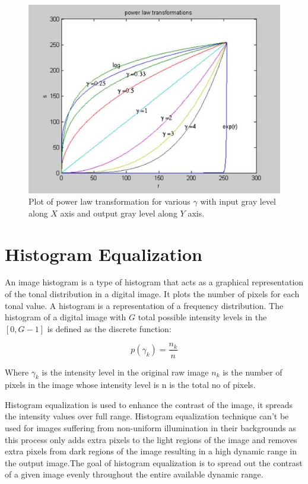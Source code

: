 \begin{figure}
	\centering
	\includegraphics[scale=0.9]{images/ch3/powerLawTransformation.jpg}
	\caption{Plot of power law transformation for various $\gamma$ with input gray level along $X$ axis and output
gray level along $Y$ axis.}
	\label{fig:powerLawTransformation}
\end{figure}

\section{Histogram Equalization}
An image histogram is a type of histogram that acts as a graphical representation of
the tonal distribution in a digital image. It plots the number of pixels for each tonal
value. A histogram is a representation of a frequency distribution. The histogram
of a digital image with $G$ total possible intensity levels in the $[0,G − 1]$ is defined
as the discrete function:

\begin{equation}
	p(\gamma_{k})=\frac{n_{k}}{n}
\end{equation}

Where $\gamma_{k}$ is the intensity level in the original raw image $n_{k}$ is the number of
pixels in the image whose intensity level is n is the total no of pixels.

Histogram equalization is used to enhance the contrast of the image, it spreads the
intensity values over full range. Histogram equalization technique can’t be used for
images suffering from non-uniform illumination in their backgrounds as this process
only adds extra pixels to the light regions of the image and removes extra pixels from
dark regions of the image resulting in a high dynamic range in the output image.The
goal of histogram equalization is to spread out the contrast of a given image evenly
throughout the entire available dynamic range.

